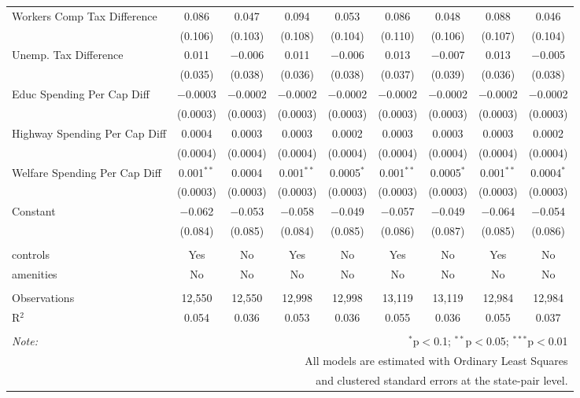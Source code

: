 \begin{table}[!htbp]
\begin{tabular}{@{\extracolsep{5pt}}lcccccccc}
  Workers Comp Tax Difference & 0.086 & 0.047 & 0.094 & 0.053 & 0.086 & 0.048 & 0.088 & 0.046 \\ 
  & (0.106) & (0.103) & (0.108) & (0.104) & (0.110) & (0.106) & (0.107) & (0.104) \\ 
  Unemp. Tax Difference & 0.011 & $-$0.006 & 0.011 & $-$0.006 & 0.013 & $-$0.007 & 0.013 & $-$0.005 \\ 
  & (0.035) & (0.038) & (0.036) & (0.038) & (0.037) & (0.039) & (0.036) & (0.038) \\ 
  Educ Spending Per Cap Diff & $-$0.0003 & $-$0.0002 & $-$0.0002 & $-$0.0002 & $-$0.0002 & $-$0.0002 & $-$0.0002 & $-$0.0002 \\ 
  & (0.0003) & (0.0003) & (0.0003) & (0.0003) & (0.0003) & (0.0003) & (0.0003) & (0.0003) \\ 
  Highway Spending Per Cap Diff & 0.0004 & 0.0003 & 0.0003 & 0.0002 & 0.0003 & 0.0003 & 0.0003 & 0.0002 \\ 
  & (0.0004) & (0.0004) & (0.0004) & (0.0004) & (0.0004) & (0.0004) & (0.0004) & (0.0004) \\ 
  Welfare Spending Per Cap Diff & 0.001$^{**}$ & 0.0004 & 0.001$^{**}$ & 0.0005$^{*}$ & 0.001$^{**}$ & 0.0005$^{*}$ & 0.001$^{**}$ & 0.0004$^{*}$ \\ 
  & (0.0003) & (0.0003) & (0.0003) & (0.0003) & (0.0003) & (0.0003) & (0.0003) & (0.0003) \\ 
  Constant & $-$0.062 & $-$0.053 & $-$0.058 & $-$0.049 & $-$0.057 & $-$0.049 & $-$0.064 & $-$0.054 \\ 
  & (0.084) & (0.085) & (0.084) & (0.085) & (0.086) & (0.087) & (0.085) & (0.086) \\ 
 \hline \\[-1.8ex] 
controls & Yes & No & Yes & No & Yes & No & Yes & No \\ 
amenities & No & No & No & No & No & No & No & No \\ 
\hline \\[-1.8ex] 
Observations & 12,550 & 12,550 & 12,998 & 12,998 & 13,119 & 13,119 & 12,984 & 12,984 \\ 
R$^{2}$ & 0.054 & 0.036 & 0.053 & 0.036 & 0.055 & 0.036 & 0.055 & 0.037 \\ 
\hline 
\hline \\[-1.8ex] 
\textit{Note:}  & \multicolumn{8}{r}{$^{*}$p$<$0.1; $^{**}$p$<$0.05; $^{***}$p$<$0.01} \\ 
 & \multicolumn{8}{r}{All models are estimated with Ordinary Least Squares} \\ 
 & \multicolumn{8}{r}{and clustered standard errors at the state-pair level.} \\ 
\end{tabular} 
\end{table} 
